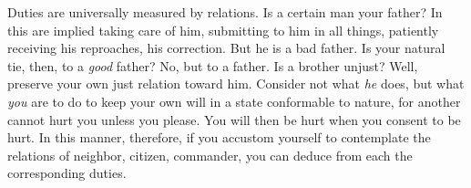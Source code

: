 Duties are universally measured by relations.  Is a certain man your father? In
this are implied taking care of him, submitting to him in all things, patiently
receiving  his reproaches,  his correction.  But he  is a  bad father.  Is your
natural tie, then, to  a \emph{good} father? No, but to a  father. Is a brother
unjust? Well,  preserve your own  just relation  toward him. Consider  not what
\emph{he} does, but what \emph{you} are to do  to keep your own will in a state
conformable to nature, for another cannot  hurt you unless you please. You will
then be  hurt when you consent  to be hurt.  In this manner, therefore,  if you
accustom yourself to contemplate the relations of neighbor, citizen, commander,
you can deduce from each the corresponding duties.
